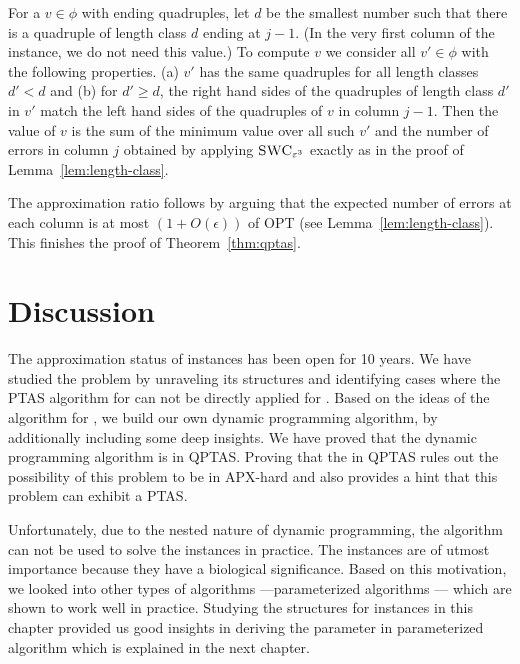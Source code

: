 For a $v \in \phi$ with ending quadruples,
let $d$ be the smallest number such that there is a quadruple of length class $d$ ending at $j-1$. (In the very first column of the instance, we do not need this value.)
To compute $v$ we consider all $v' \in \phi$ with the following properties.
(a) $v'$ has the same quadruples for all length classes $d' < d$ and 
(b) for $d' \ge d$, the right hand sides of the quadruples of length class $d'$ in $v'$ match the left hand sides of the quadruples of $v$ in column $j-1$.
Then the value of $v$ is the sum of the minimum value over all such $v'$ and the number of errors in column $j$ obtained by applying $\textsc{SWC}_{\varepsilon^3}$ exactly as in the proof of Lemma~\ref{lem:length-class}. 
%

The approximation ratio follows 
by
arguing that the expected number of errors at each column is at most $(1+O(\epsilon))$ of OPT
(see Lemma~\ref{lem:length-class}).
This finishes the proof of Theorem~\ref{thm:qptas}.
\section{Discussion}
The approximation status of \GMEC instances has been open for 10 years. We have studied the problem by unraveling its structures and identifying cases where the PTAS algorithm for \BMEC can not be directly applied for \GMEC.
Based on the ideas of the algorithm for \BMEC, we build our own dynamic programming algorithm, by additionally including some deep insights. We have proved that the dynamic programming algorithm is in QPTAS.
Proving that the \GMEC in QPTAS rules out the possibility of this problem to be in APX-hard and also provides a hint that this problem can exhibit a PTAS.

Unfortunately, due to the nested nature of dynamic programming, the algorithm can not be used to solve the \GMEC instances in practice.
The \GMEC instances are of utmost importance because they have a biological significance.
Based on this motivation, we looked into other types of algorithms ---parameterized algorithms \citep{martin2016whatshap} --- which are shown to work well in practice.
Studying the structures for \GMEC instances in this chapter provided us good insights in deriving the parameter in parameterized algorithm which is explained in the next chapter.